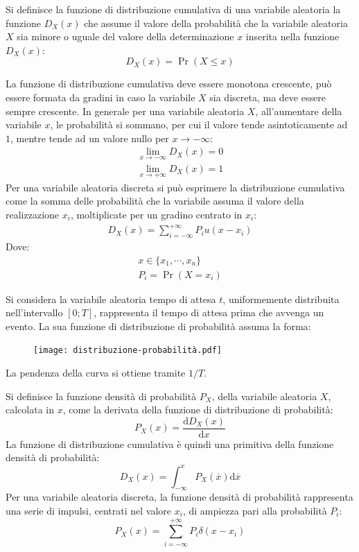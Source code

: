 \documentclass{article}
\newcommand{\df}{\mathrm{d}}
\numberwithin{equation}{subsection}
\begin{document}
Si definisce la funzione di distribuzione cumulativa di una variabile aleatoria la funzione $D_X(x)$ che assume il valore della probabilità che la variabile aleatoria 
$X$ sia minore o uguale del valore della determinazione $x$ inserita nella funzione $D_X(x)$:
\begin{equation}
    D_X(x)=\Pr(X\leq x)
\end{equation}


La funzione di distribuzione cumulativa deve essere monotona crescente, può essere formata da gradini in caso la variabile $X$ sia discreta, ma deve essere sempre crescente. In generale per una variabile 
aleatoria $X$, all'aumentare della variabile $x$, le probabilità si sommano, per cui il valore tende asintoticamente ad $1$, mentre tende ad un valore nullo 
per $x\to-\infty$:
\begin{gather*}
    \lim_{x\to-\infty}D_X(x)=0\\
    \lim_{x\to+\infty}D_X(x)=1
\end{gather*}
Per una variabile aleatoria discreta si può esprimere la distribuzione cumulativa come la somma delle probabilità che la variabile assuma il valore della realizzazione $x_i$, moltiplicate per un gradino 
centrato in $x_i$:
\begin{gather}
    D_X(x)=\displaystyle\sum_{i=-\infty}^{+\infty}P_iu(x-x_i)
\end{gather}
Dove:
\begin{gather*}
    x\in\{x_1,\cdots,x_n\}\\
    P_i=\Pr(X=x_i)
\end{gather*}

Si considera la variabile aleatoria tempo di attesa $t$, uniformemente distribuita nell'intervallo $[0;T]$, rappresenta il tempo di attesa prima 
che avvenga un evento. La sua funzione di distribuzione di probabilità assuma la forma:
\begin{figure}[H]%
    \centering
    \texttt{[image: distribuzione-probabilità.pdf]}%
\end{figure}

La pendenza della curva si ottiene tramite $1/T$. 



Si definisce la funzione densità di probabilità $P_X$, della variabile aleatoria $X$, calcolata in $x$, come la derivata della funzione di distribuzione di probabilità:
\begin{equation}
    P_X(x)=\displaystyle\frac{\df D_X(x)}{\df x}
\end{equation}
La funzione di distribuzione cumulativa è quindi una primitiva della funzione densità di probabilità:
\begin{equation}
    D_X(x)=\displaystyle\int_{-\infty}^{x}P_X(\overline x)\df\overline x
\end{equation}
Per una variabile aleatoria discreta, la funzione densità di probabilità rappresenta una serie di impulsi, centrati nel valore $x_i$, di ampiezza pari alla probabilità $P_i$:
\begin{equation}
    P_X(x)=\displaystyle\sum_{i=-\infty}^{+\infty}P_i\delta(x-x_i)
\end{equation}
\end{document}
